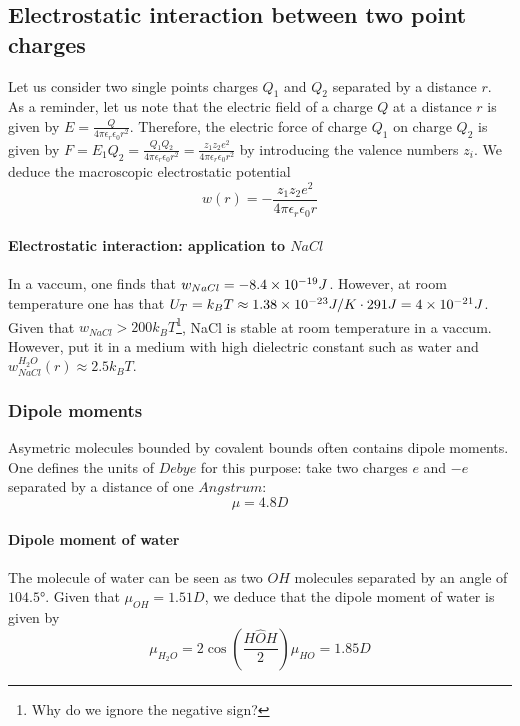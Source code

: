 \documentclass[../phys-f308.tex]{subfiles}
\begin{document}
    \subsection{Electrostatic interaction between two point charges}
    Let us consider two single points charges $Q_1$ and $Q_2$ separated by a distance $r$. As a reminder, let us note that the electric field of a charge $Q$ at a distance $r$ is given by $E = \frac{Q}{4\pi\epsilon_r\epsilon_0 r^2}$. Therefore, the electric force of charge $Q_1$ on charge $Q_2$ is given by $F=E_1Q_2 = \frac{Q_1Q_2}{4\pi\epsilon_r\epsilon_0 r^2} = \frac{z_1z_2 e^2}{4\pi\epsilon_r\epsilon_0 r^2}$ by introducing the valence numbers $z_i$. We deduce the macroscopic electrostatic potential
    \begin{equation}
        w(r) = -\frac{z_1z_2e^2}{4\pi\epsilon_r\epsilon_0 r}
    \end{equation} 

    \paragraph{Electrostatic interaction: application to $NaCl$}

    In a vaccum, one finds that $w_{NaCl} = -8.4\times 10^{-19}J$. However, at room temperature one has that $U_T = k_BT \approx 1.38\times 10^{-23} J/K \cdot 291 J = 4\times 10^{-21}J$. Given that \color{red}$w_{NaCl}>200 k_BT$\footnote{Why do we ignore the negative sign?}\color{black}, NaCl is stable at room temperature in a vaccum. However, put it in a medium with high dielectric constant such as water and $w_{NaCl}^{H_2O}(r) \approx 2.5 k_BT$.

    \subsubsection{Dipole moments}

    Asymetric molecules bounded by covalent bounds often contains dipole moments. One defines the units of $Debye$ for this purpose: take two charges $e$ and $-e$ separated by a distance of one $Angstrum$:
    \begin{equation*}
        \mu = 4.8 D
    \end{equation*}

    \paragraph{Dipole moment of water}

    \begin{example}
        The molecule of water can be seen as two $OH$ molecules separated by an angle of $104.5°$. Given that $\mu_{OH} = 1.51 D$, we deduce that the dipole moment of water is given by 
        \begin{equation}
            \mu_{H_2O} = 2\cos\left(\frac{H\hat{O}H}{2}\right)\mu_{HO} = 1.85D
        \end{equation}
    \end{example}
\end{document}
